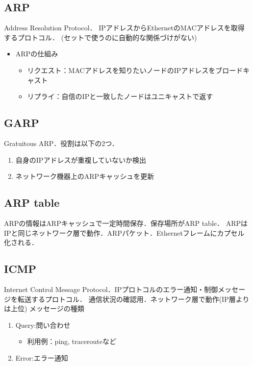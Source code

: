 \subsection{ARP}
Address Resolution Protocol．
IPアドレスからEthernetのMACアドレスを取得するプロトコル．
(セットで使うのに自動的な関係づけがない)

\begin{itemize}
    \item ARPの仕組み
    \begin{itemize}
        \item リクエスト：MACアドレスを知りたいノードのIPアドレスをブロードキャスト
        \item リプライ：自信のIPと一致したノードはユニキャストで返す
    \end{itemize}
\end{itemize}

\subsection{GARP}
Gratuitous ARP．役割は以下の2つ．
\begin{enumerate}
    \item 自身のIPアドレスが重複していないか検出
    \item ネットワーク機器上のARPキャッシュを更新
\end{enumerate}

\subsection{ARP table}
ARPの情報はARPキャッシュで一定時間保存．保存場所がARP table．
ARPはIPと同じネットワーク層で動作．ARPパケット．Ethernetフレームにカプセル化される．

\subsection{ICMP}
Internet Control Message Protocol．IPプロトコルのエラー通知・制御メッセージを転送するプロトコル．
通信状況の確認用．ネットワーク層で動作(IP層よりは上位)
メッセージの種類
\begin{enumerate}
    \item Query:問い合わせ
    \begin{itemize}
        \item 利用例：ping, tracerouteなど
    \end{itemize}
    \item Error:エラー通知
\end{enumerate}

